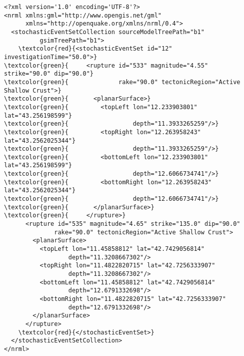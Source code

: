 \begin{Verbatim}[frame=single, commandchars=\\\{\}, fontsize=\small]
<?xml version='1.0' encoding='UTF-8'?>
<nrml xmlns:gml="http://www.opengis.net/gml"
	  xmlns="http://openquake.org/xmlns/nrml/0.4">
  <stochasticEventSetCollection sourceModelTreePath="b1"
          gsimTreePath="b1">
    \textcolor{red}{<stochasticEventSet id="12" investigationTime="50.0">}
\textcolor{green}{     <rupture id="533" magnitude="4.55" strike="90.0" dip="90.0"}
\textcolor{green}{              rake="90.0" tectonicRegion="Active Shallow Crust">}
\textcolor{green}{       <planarSurface>}
\textcolor{green}{         <topLeft lon="12.233903801" lat="43.256198599"}
\textcolor{green}{                  depth="11.3933265259"/>}
\textcolor{green}{         <topRight lon="12.263958243" lat="43.2562025344"}
\textcolor{green}{                  depth="11.3933265259"/>}
\textcolor{green}{         <bottomLeft lon="12.233903801" lat="43.256198599"}
\textcolor{green}{                  depth="12.6066734741"/>}
\textcolor{green}{         <bottomRight lon="12.263958243" lat="43.2562025344"}
\textcolor{green}{                  depth="12.6066734741"/>}
\textcolor{green}{       </planarSurface>}
\textcolor{green}{     </rupture>}
      <rupture id="535" magnitude="4.65" strike="135.0" dip="90.0"
              rake="90.0" tectonicRegion="Active Shallow Crust">
        <planarSurface>
          <topLeft lon="11.45858812" lat="42.7429056814"
                  depth="11.3208667302"/>
          <topRight lon="11.4822820715" lat="42.7256333907"
                  depth="11.3208667302"/>
          <bottomLeft lon="11.45858812" lat="42.7429056814"
                  depth="12.6791332698"/>
          <bottomRight lon="11.4822820715" lat="42.7256333907"
                  depth="12.6791332698"/>
        </planarSurface>
      </rupture>
    \textcolor{red}{</stochasticEventSet>}
  </stochasticEventSetCollection>
</nrml>
\end{Verbatim}